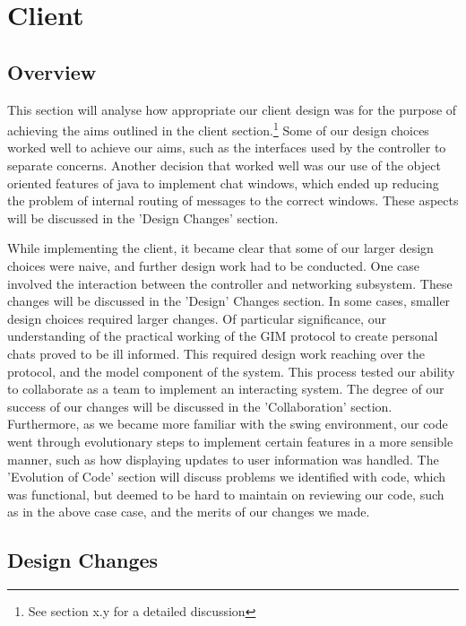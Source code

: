 \section{Client}

\subsection{Overview}

This section will analyse how appropriate our client design  was for the purpose of achieving the aims outlined in the client section.\footnote{See section x.y for a detailed discussion}  Some of our design choices worked well to achieve our aims, such as the interfaces used by the controller to separate concerns. Another decision that worked well was our use of the object oriented features of java to implement chat windows, which ended up reducing the problem of internal routing of messages to the correct windows. These aspects will be discussed in the 'Design Changes' section.

While implementing the client, it became clear that some of our larger design choices were naive, and further design work had to be conducted. One case involved the interaction between the controller and networking subsystem. These changes will be discussed in the 'Design' Changes section. In some cases, smaller design choices required larger changes. Of particular significance, our understanding of the practical working of the GIM protocol to create personal chats proved to be ill informed. This required design work reaching over the protocol, and the model component of the system. This process tested our ability to collaborate as a team to implement an interacting system. The degree of our success of our changes will be discussed in the 'Collaboration' section. Furthermore, as we became more familiar with the swing environment, our code went through evolutionary steps to implement certain features in a more sensible manner, such as how displaying updates to user information was handled. The 'Evolution of Code' section will discuss problems we identified with code, which was functional,  but deemed to be hard to maintain on reviewing our code, such as in the above case case, and the merits of our changes we made. 

\subsection{Design Changes}



